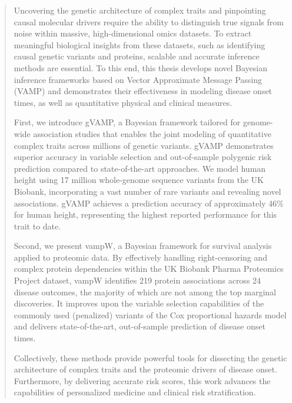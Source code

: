 \documentclass[draft,final]{istaustriathesis}
\begin{document}
\begin{abstract}
Uncovering the genetic architecture of complex traits and pinpointing causal molecular drivers require the ability to distinguish true signals from noise within massive, high-dimensional omics datasets. To extract meaningful biological insights from these datasets, such as identifying causal genetic variants and proteins, scalable and accurate inference methods are essential. To this end, this thesis develops novel Bayesian inference frameworks based on Vector Approximate Message Passing (VAMP) and demonstrates their effectiveness in modeling disease onset times, as well as quantitative physical and clinical measures.

First, we introduce gVAMP, a Bayesian framework tailored for genome-wide association studies that enables the joint modeling of quantitative complex traits across millions of genetic variants. gVAMP demonstrates superior accuracy in variable selection and out-of-sample polygenic risk prediction compared to state-of-the-art approaches. We model human height using 17 million whole-genome sequence variants from the UK Biobank, incorporating a vast number of rare variants and revealing novel associations. gVAMP achieves a prediction accuracy of approximately 46\% for human height, representing the highest reported performance for this trait to date.

Second, we present vampW, a Bayesian framework for survival analysis applied to proteomic data. By effectively handling right-censoring and complex protein dependencies within the UK Biobank Pharma Proteomics Project dataset, vampW identifies 219 protein associations across 24 disease outcomes, the majority of which are not among the top marginal discoveries. It improves upon the variable selection capabilities of the commonly used (penalized) variants of the Cox proportional hazards model and delivers state-of-the-art, out-of-sample prediction of disease onset times.

Collectively, these methods provide powerful tools for dissecting the genetic architecture of complex traits and the proteomic drivers of disease onset. Furthermore, by delivering accurate risk scores, this work advances the capabilities of personalized medicine and clinical risk stratification.

\end{abstract}
\end{document}
